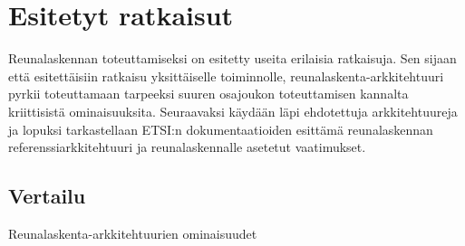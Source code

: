 \documentclass[finnish]{tktltiki2}
\theoremstyle{definition}
\theoremstyle{remark}
\begin{document}
\section{Esitetyt ratkaisut}
Reunalaskennan toteuttamiseksi on esitetty useita erilaisia ratkaisuja.
Sen sijaan että esitettäisiin ratkaisu yksittäiselle toiminnolle, reunalaskenta-arkkitehtuuri pyrkii toteuttamaan tarpeeksi suuren osajoukon toteuttamisen kannalta kriittisistä ominaisuuksita.
Seuraavaksi käydään läpi ehdotettuja arkkitehtuureja ja lopuksi tarkastellaan ETSI:n
dokumentaatioiden esittämä reunalaskennan referenssiarkkitehtuuri ja
reunalaskennalle asetetut vaatimukset.







 






\subsection{Vertailu}


\begin{table}
	\caption{Reunalaskenta-arkkitehtuurien ominaisuudet}
	\label{table:features}
	
\end{table}
 




\lastpage



% 
\end{document}
